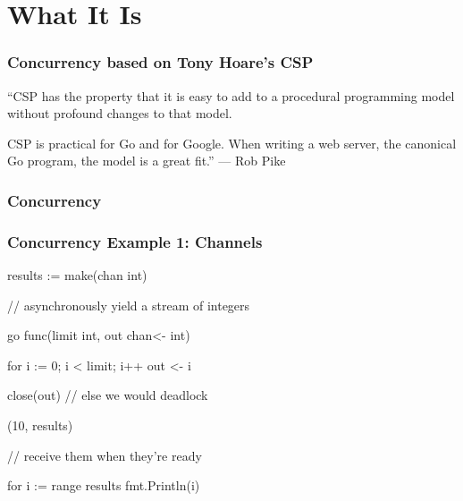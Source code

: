 \documentclass[compress,t,11pt]{beamer}
\begin{document}
\section{What It Is}
\begin{frame}
    \frametitle{Concurrency based on Tony Hoare's CSP}
    { ``CSP has the property that it is easy to add to
    a procedural programming model without profound changes to that model. \par
    \vspace{0.2\baselineskip}
    CSP is practical for Go and for Google. When writing a web server, the
    canonical Go program, the model is a great fit.'' --- Rob Pike \\}
\end{frame}

\begin{frame}
    \frametitle{Concurrency}
    \vspace{\baselineskip}
    \vspace{\baselineskip}
    \vspace{\baselineskip}
\end{frame}

\begin{frame}[fragile]
\frametitle{Concurrency Example 1: Channels}
\begin{golang}
results := make(chan int)

// asynchronously yield a stream of integers

go func(limit int, out chan<- int) {
    for i := 0; i < limit; i++ {
        out <- i
    }

    close(out)  // else we would deadlock
}(10, results)

// receive them when they're ready

for i := range results {
    fmt.Println(i)
}
\end{golang}
\end{frame}
\end{document}
